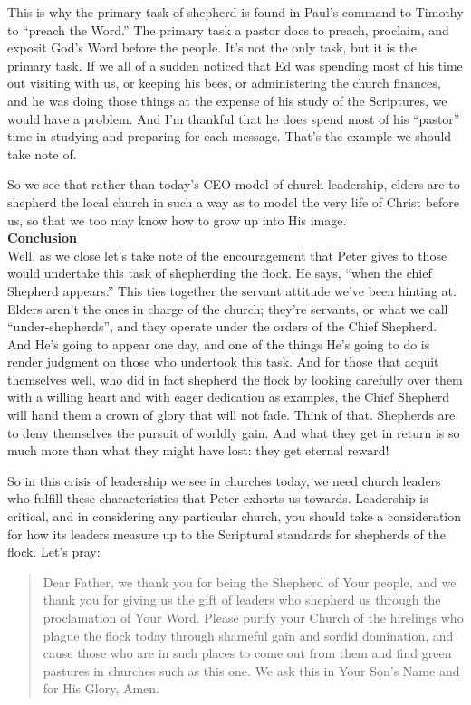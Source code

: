 \documentclass[letterpaper, 12pt]{article}
\begin{document}
    This is why the primary task of shepherd is found in Paul's command
    to Timothy to ``preach the Word.'' The primary task a pastor does to
    preach, proclaim, and exposit God's Word before the people. It's not
    the only task, but it is the primary task. If we all of a sudden
    noticed that Ed was spending most of his time out visiting with us,
    or keeping his bees, or administering the church finances, and he
    was doing those things at the expense of his study of the
    Scriptures, we would have a problem. And I'm thankful that he does
    spend most of his ``pastor'' time in studying and preparing for each
    message. That's the example we should take note of.

    So we see that rather than today's CEO model of church leadership,
    elders are to shepherd the local church in such a way as to model
    the very life of Christ before us, so that we too may know how to
    grow up into His image. \\

    \noindent \textbf{Conclusion} \\

    Well, as we close let's take note of the encouragement that Peter
    gives to those would undertake this task of shepherding the flock.
    He says, ``when the chief Shepherd appears.'' This ties together the
    servant attitude we've been hinting at. Elders aren't the ones in
    charge of the church; they're servants, or what we call
    ``under-shepherds'', and they operate under the orders of the Chief
    Shepherd. And He's going to appear one day, and one of the things
    He's going to do is render judgment on those who undertook this
    task. And for those that acquit themselves well, who did in fact
    shepherd the flock by looking carefully over them with a willing
    heart and with eager dedication as examples, the Chief Shepherd will
    hand them a crown of glory that will not fade.  Think of that.
    Shepherds are to deny themselves the pursuit of worldly gain. And
    what they get in return is so much more than what they might have
    lost: they get eternal reward!

    So in this crisis of leadership we see in churches today, we need
    church leaders who fulfill these characteristics that Peter exhorts
    us towards. Leadership is critical, and in considering any
    particular church, you should take a consideration for how its
    leaders measure up to the Scriptural standards for shepherds of the
    flock. Let's pray:

    \begin{quote}

        Dear Father, we thank you for being the Shepherd of Your people,
        and we thank you for giving us the gift of leaders who shepherd
        us through the proclamation of Your Word. Please purify your
        Church of the hirelings who plague the flock today through
        shameful gain and sordid domination, and cause those who are in
        such places to come out from them and find green pastures in
        churches such as this one. We ask this in Your Son's Name and
        for His Glory, Amen.

    \end{quote}
\end{document}
